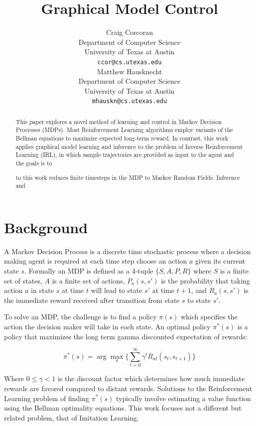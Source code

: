 \documentclass{article} %
\title{Graphical Model Control}
\author{
Craig Corcoran\\
Department of Computer Science\\
University of Texas at Austin\\
\texttt{ccor@cs.utexas.edu} \\
\And
Matthew Hausknecht\\
Department of Computer Science\\
University of Texas at Austin\\
\texttt{mhauskn@cs.utexas.edu} \\
}
\begin{document}
\maketitle

\begin{abstract}
  This paper explores a novel method of learning and control in Markov Decision Processes (MDPs). Most Reinforcement Learning algorithms employ variants of the Bellman equations to maximize expected long-term reward. In contrast, this work applies graphical model learning and inference to the problem of Inverse Reinforcement Learning (IRL), in which sample trajectories are provided as input to the agent and the goals is to 

to this work reduces finite timesteps in the MDP to Markov Random Fields. Inference and 
\end{abstract}

\section{Background}
A Markov Decision Process is a discrete time stochastic process where a decision making agent is required at each time step choose an action $a$ given its current state $s$. Formally an MDP is defined as a 4-tuple $\{S,A,P,R\}$ where $S$ is a finite set of states, $A$ is a finite set of actions, $P_a(s,s')$ is the probability that taking action $a$ in state $s$ at time $t$ will lead to state $s'$ at time $t+1$, and $R_a(s,s')$ is the immediate reward received after transition from state $s$ to state $s'$.

To solve an MDP, the challenge is to find a policy $\pi(s)$ which specifies the action the decision maker will take in each state. An optimal policy $\pi^*(s)$ is a policy that maximizes the long term gamma discounted expectation of rewards:

\begin{equation}
\label{eqn:opt-policy}
\pi^*(s) = \arg\max_\pi \{\sum_{t=0}^{\infty} \gamma^tR_{at}(s_t,s_{t+1}) \}
\end{equation}

Where $0 \le \gamma < 1$ is the discount factor which determines how much immediate rewards are favored compared to distant rewards. Solutions to the Reinforcement Learning problem of finding $\pi^*(s)$ typically involve estimating a value function using the Bellman optimality equations. This work focuses not a different but related problem, that of Imitation Learning.
\end{document}
